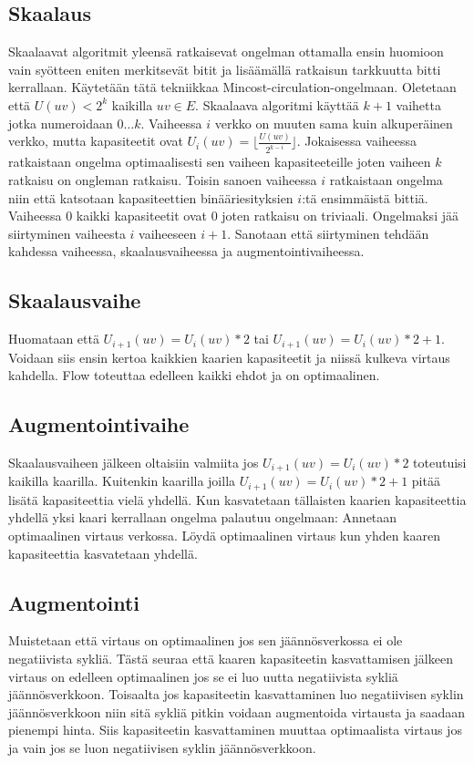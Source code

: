 \documentclass[a4paper, 11pt]{article}
\begin{document}
\subsection*{Skaalaus}
Skaalaavat algoritmit yleensä ratkaisevat ongelman ottamalla ensin huomioon vain syötteen
eniten merkitsevät bitit ja lisäämällä ratkaisun tarkkuutta bitti kerrallaan. Käytetään
tätä tekniikkaa Mincost-circulation-ongelmaan. Oletetaan että $U(uv) < 2^k$ kaikilla $uv \in E$.
Skaalaava algoritmi käyttää $k+1$ vaihetta jotka numeroidaan $0 \ldots k$. Vaiheessa 
$i$ verkko on muuten sama kuin 
alkuperäinen verkko, mutta kapasiteetit ovat $U_i(uv) = \lfloor \frac{U(uv)}{2^{k-i}} \rfloor$.
Jokaisessa vaiheessa ratkaistaan ongelma optimaalisesti sen vaiheen kapasiteeteille joten vaiheen
$k$ ratkaisu on ongleman ratkaisu.
Toisin sanoen vaiheessa $i$ ratkaistaan ongelma niin että katsotaan kapasiteettien
binääriesityksien $i$:tä ensimmäistä bittiä. Vaiheessa $0$ kaikki kapasiteetit ovat $0$ joten
ratkaisu on triviaali. Ongelmaksi jää siirtyminen vaiheesta $i$ vaiheeseen $i+1$. Sanotaan
että siirtyminen tehdään kahdessa vaiheessa, skaalausvaiheessa ja augmentointivaiheessa.
\subsection*{Skaalausvaihe}
Huomataan että $U_{i+1}(uv) = U_i(uv)*2$ tai $U_{i+1}(uv) = U_i(uv)*2+1$. Voidaan siis ensin kertoa
kaikkien kaarien kapasiteetit ja niissä kulkeva virtaus kahdella. Flow toteuttaa edelleen
kaikki ehdot ja on optimaalinen.
\subsection*{Augmentointivaihe}
Skaalausvaiheen jälkeen oltaisiin valmiita jos $U_{i+1}(uv) = U_i(uv)*2$ toteutuisi kaikilla
kaarilla. Kuitenkin kaarilla joilla $U_{i+1}(uv) = U_i(uv)*2+1$ pitää lisätä kapasiteettia 
vielä yhdellä.
Kun kasvatetaan tällaisten kaarien kapasiteettia yhdellä yksi kaari kerrallaan 
ongelma palautuu ongelmaan:
Annetaan optimaalinen virtaus verkossa. Löydä optimaalinen virtaus kun yhden kaaren 
kapasiteettia kasvatetaan yhdellä.
\subsection*{Augmentointi}
Muistetaan että virtaus on optimaalinen jos sen jäännösverkossa ei ole negatiivista
sykliä. Tästä seuraa että kaaren kapasiteetin kasvattamisen jälkeen virtaus on edelleen optimaalinen
jos se ei luo uutta negatiivista sykliä jäännösverkkoon. Toisaalta jos kapasiteetin
kasvattaminen luo negatiivisen syklin jäännösverkkoon niin sitä sykliä pitkin voidaan
augmentoida virtausta ja saadaan pienempi hinta. Siis kapasiteetin kasvattaminen 
muuttaa optimaalista virtaus
jos ja vain jos se luon negatiivisen syklin jäännösverkkoon. 
\end{document}
